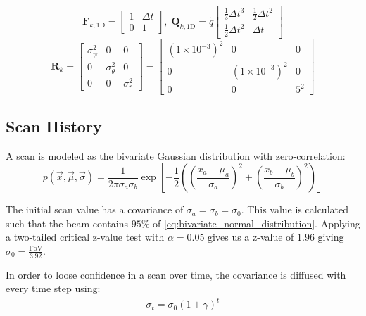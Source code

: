 \begin{equation}\label{eq:process_model}
\mathbf{F}_{k,\mathrm{1D}}=\begin{bmatrix}
    1&\Delta{t}\\0&1\end{bmatrix},\;\mathbf{Q}_{k,\mathrm{1D}}=\tilde{q}\begin{bmatrix}\frac{1}{3}\Delta{t}^{3}&\frac{1}{2}\Delta{t}^{2}\\\frac{1}{2}\Delta{t}^{2}&\Delta{t}\end{bmatrix}
\end{equation}
\begin{equation}\label{eq:measurement_model}
\mathbf{R}_{k}=\begin{bmatrix}
    \sigma^{2}_{\psi}&0&0\\0&\sigma^{2}_{\theta}&0\\0&0&\sigma^{2}_{r}\end{bmatrix}=\begin{bmatrix}
    (1\times{}10^{-3})^{2}&0&0\\0&(1\times{}10^{-3})^{2}&0\\0&0&5^2\end{bmatrix}
\end{equation}

\subsection{Scan History}

A scan is modeled as the bivariate Gaussian distribution with zero-correlation:
\begin{equation}
    p(\vec x, \vec \mu, \vec \sigma) = \frac{1}{2\pi\sigma_a\sigma_b} \exp{\left[ -\frac{1}{2}\left(
        \left(\frac{x_a-\mu_{a}}{\sigma_a}\right)^2 +  \left(\frac{x_b-\mu_{b}}{\sigma_b}\right)^2 
    \right)
    \right]} 
    \label{eq:bivariate_normal_distribution}    
\end{equation}

The initial scan value has a covariance of $\sigma_a = \sigma_b = \sigma_0$. 
This value is calculated such that the beam contains $95\%$ of \eqref{eq:bivariate_normal_distribution}. 
Applying a two-tailed critical z-value test with $\alpha=0.05$ gives us a z-value of $1.96$ giving $\sigma_0 = \frac{\mathrm{FoV}}{3.92}$.

In order to loose confidence in a scan over time, the covariance is diffused with every time step using:
\begin{gather}
    \sigma_{t} = \sigma_{0} (1+\gamma)^t
    \label{eq:sigma_t}
\end{gather}


